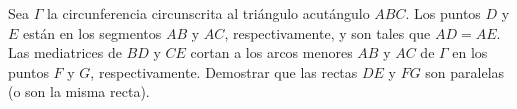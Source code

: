 Sea $\Gamma$ la circunferencia circunscrita al triángulo acutángulo $ABC$. Los puntos $D$ y $E$ están en los segmentos $AB$ y $AC$, respectivamente, y son tales que $AD = AE$. Las mediatrices de $BD$ y $CE$ cortan a los arcos menores $AB$ y $AC$ de $\Gamma$ en los puntos $F$ y $G$, respectivamente. Demostrar que las rectas $DE$ y $FG$ son paralelas (o son la misma recta).
